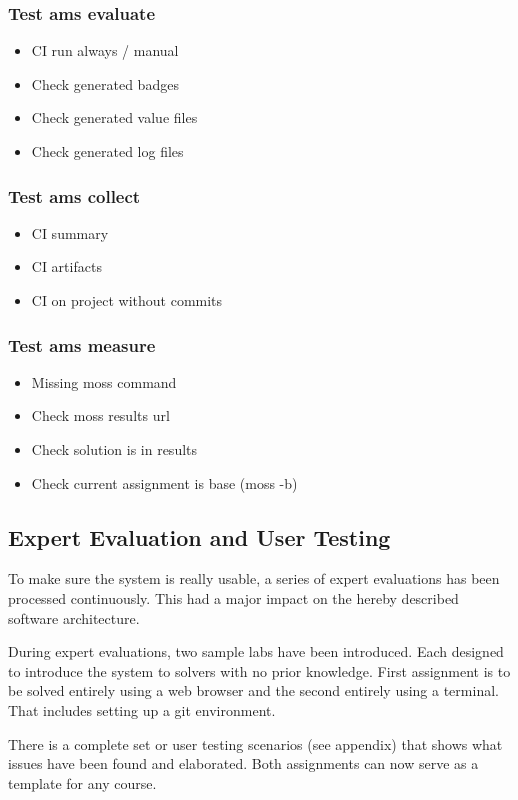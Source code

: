 \subsubsection{Test ams evaluate}

\begin{itemize}
\item
  {CI run always / manual}
\item
  {Check generated badges}
\item
  {Check generated value files}
\item
  {Check generated log files}
\end{itemize}

\subsubsection{Test ams collect}

\begin{itemize}
\item
  {CI summary}
\item
  {CI artifacts}
\item
  {CI on project without commits}
\end{itemize}

\subsubsection{Test ams measure}

\begin{itemize}
\item
  {Missing moss command}
\item
  {Check moss results url}
\item
  {Check solution is in results}
\item
  {Check current assignment is base (moss -b)}
\end{itemize}

\subsection{Expert Evaluation and User Testing}\label{ssec:experteval}

{To make sure the system is really usable, a series of expert evaluations has been processed continuously. This had a major impact on the hereby described software architecture.}

{During expert evaluations, two sample labs have been introduced. Each designed to introduce the system to solvers with no prior knowledge. First assignment is to be solved entirely using a web browser and the second entirely using a terminal. That includes setting up a git environment.}

{There is a complete set or user testing scenarios (see appendix) that shows what issues have been found and elaborated. Both assignments can now serve as a template for any course.}

